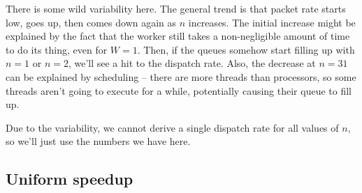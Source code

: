 \documentclass{article}
\begin{document}
There is some wild variability here. The general trend is that packet rate starts low, goes up, then comes down again as $n$ increases. The initial increase might be explained by the fact that the worker still takes a non-negligible amount of time to do its thing, even for $W=1$. Then, if the queues somehow start filling up with $n=1$ or $n=2$, we'll see a hit to the dispatch rate. Also, the decrease at $n=31$ can be explained by scheduling -- there are more threads than processors, so some threads aren't going to execute for a while, potentially causing their queue to fill up.

Due to the variability, we cannot derive a single dispatch rate for all values of $n$, so we'll just use the numbers we have here.
\subsection*{Uniform speedup}
\end{document}

